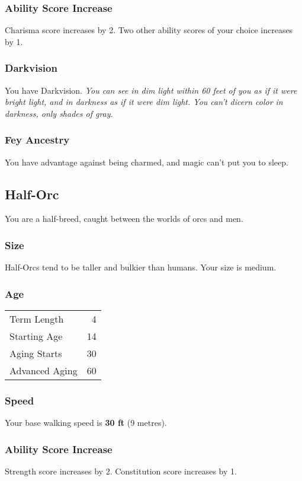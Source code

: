 \documentclass[10pt,twoside]{article}
\begin{document}
\begin{multicols}{2}
\subsubsection*{Ability Score Increase}
Charisma score increases by 2.
Two other ability scores of your choice increases by 1.

\subsubsection*{Darkvision}
You have Darkvision.
\textit{You can see in dim light within 60 feet of you as if it were bright light, and in darkness as if it were dim light. You can’t dicern color in darkness, only shades of gray.}

\subsubsection*{Fey Ancestry}
You have advantage against being charmed, and magic can't put you to sleep.


\subsection{Half-Orc}

You are a half-breed, caught between the worlds of orcs and men.

\subsubsection*{Size}
Half-Orcs tend to be taller and bulkier than humans. Your size is medium.

\subsubsection*{Age}
\begin{tabular}{ l r }
  Term Length & 4 \\
  Starting Age & 14 \\
  Aging Starts & 30 \\
  Advanced Aging & 60 \\
\end{tabular}

\subsubsection*{Speed}
Your base walking speed is \textbf{30 ft} (9 metres).

\subsubsection*{Ability Score Increase}
Strength score increases by 2.
Constitution score increases by 1.


\end{multicols}
\end{document}

